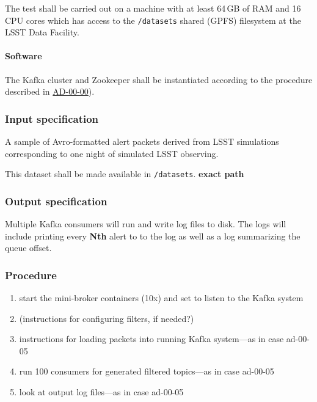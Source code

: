 The test shall be carried out on a machine with at least 64\,GB of RAM and
16 CPU cores which has access to the \texttt{/datasets} shared (GPFS)
filesystem at the LSST Data Facility.

\paragraph{Software}

The Kafka cluster and Zookeeper shall be instantiated according to the 
procedure described in \hyperref[ad-00-00]{AD-00-00}).

\subsubsection{Input specification}

A sample of Avro-formatted alert packets derived from LSST simulations corresponding to one night of simulated LSST observing.

This dataset shall be made available in \texttt{/datasets}.  \textbf{exact path}

\subsubsection{Output specification}

Multiple Kafka consumers will run and write log files to disk.
The logs will include printing every \textbf{Nth} alert to to the log as well as a log summarizing the queue offset.


\subsubsection{Procedure}

\begin{enumerate}

  \item{start the mini-broker containers (10x) and set to listen to the Kafka system}

  \item{(instructions for configuring filters, if needed?)}

  \item{instructions for loading packets into running Kafka system---as in case ad-00-05}

  \item{run 100 consumers for generated filtered topics---as in case ad-00-05}

  \item{look at output log files---as in case ad-00-05}

\end{enumerate}
